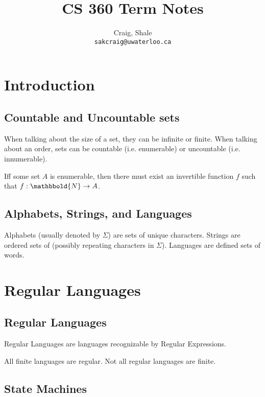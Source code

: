 \ifdefined\isphone
  
\else
  
\fi




\title{CS 360 Term Notes}

\author{
    Craig, Shale\\
    \texttt{sakcraig@uwaterloo.ca}
}
\maketitle

\tableofcontents

\chapter{Introduction}
    \section{Countable and Uncountable sets}
        When talking about the size of a set, they can be infinite or finite.
        When talking about an order, sets can be countable (i.e. enumerable) or
        uncountable (i.e. innumerable).

        Iff some set $A$ is enumerable, then there must exist an invertible
        function $f$ such that $f:\mathbbold{N} \to A$.
    \section{Alphabets, Strings, and Languages}
        Alphabets (usually denoted by $\Sigma$) are sets of unique characters.
        Strings are ordered sets of (possibly repeating characters in $\Sigma$).
        Languages are defined sets of words.

\chapter{Regular Languages}
    \section{Regular Languages}
        Regular Languages are languages recognizable by Regular Expressions.

        All finite languages are regular. Not all regular languages are finite.
    \section{State Machines}
